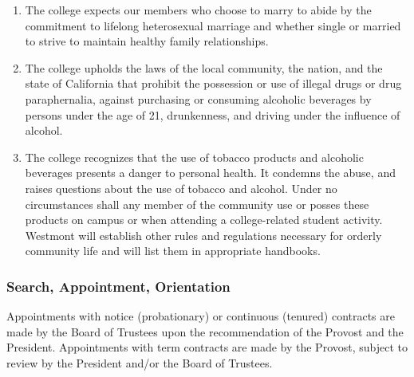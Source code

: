 \documentclass[letterpaper, 11pt]{article}
\begin{document}
\begin{enumerate}[label=\alph*)]
{\begin{enumerate}[label=\arabic*)]
							\item{The college expects our members who choose to marry to abide by the commitment to lifelong heterosexual marriage and whether single or married to strive to maintain healthy family relationships.}
							\item{The college upholds the laws of the local community, the nation, and the state of California that prohibit the possession or use of illegal drugs or drug paraphernalia, against purchasing or consuming alcoholic beverages by persons under the age of 21, drunkenness, and driving under the influence of alcohol.}
							\item{The college recognizes that the use of tobacco products and alcoholic beverages presents a danger to personal health.  It condemns the abuse, and raises questions about the use of tobacco and alcohol.  Under no circumstances shall any member of the community use or posses these products on campus or when attending a college-related student activity.}
							Westmont will establish other rules and regulations necessary for orderly community life and will list them in appropriate handbooks.
						\end{enumerate}
					}
				\end{enumerate}
		\subsubsection{Search, Appointment, Orientation}
			Appointments with notice (probationary) or continuous (tenured) contracts are made by the Board of Trustees upon the recommendation of the Provost and the President. Appointments with term contracts are made by the Provost, subject to review by the President and/or the Board of Trustees.
\end{document}
